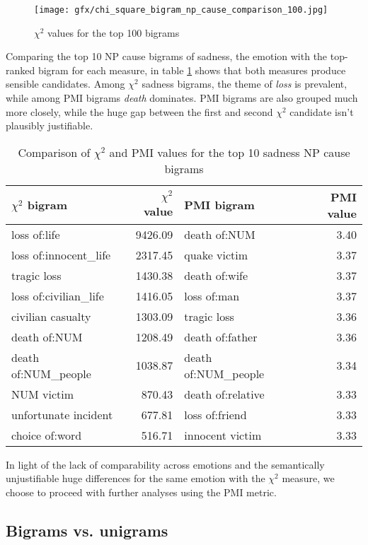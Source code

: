\begin{figure}[bth]
\texttt{[image: gfx/chi\_square\_bigram\_np\_cause\_comparison\_100.jpg]}
\caption{$\chi^{2}$ values for the top 100 bigrams}\label{fig:chi-square distribution}
\end{figure}

Comparing the top 10 NP cause bigrams of sadness, the emotion with the top-ranked bigram for each measure, in table \ref{tab:chi-pmi sadness} shows that both measures produce sensible candidates. Among $\chi^{2}$ sadness bigrams, the theme of \textit{loss} is prevalent, while among PMI bigrams \textit{death} dominates. PMI bigrams are also grouped much more closely, while the huge gap between the first and second $\chi^{2}$ candidate isn't plausibly justifiable.

\begin{table}[h]
\centering
\begin{tabular}{l|r|l|r}
{\bf $\chi^{2}$ bigram} & {\bf $\chi^{2}$ value} & {\bf PMI bigram} & {\bf PMI value} \\\hline
loss of:life & 9426.09 & death of:NUM & 3.40 \\
loss of:innocent\_life  & 2317.45 & quake victim & 3.37 \\
tragic loss             & 1430.38 & death of:wife & 3.37 \\
loss of:civilian\_life  & 1416.05 & loss of:man & 3.37 \\
civilian casualty       & 1303.09 & tragic loss & 3.36 \\
death of:NUM            & 1208.49 & death of:father & 3.36 \\
death of:NUM\_people & 1038.87 & death of:NUM\_people & 3.34 \\
NUM victim           & 870.43 & death of:relative & 3.33 \\
unfortunate incident    & 677.81 & loss of:friend & 3.33 \\
choice of:word          & 516.71 & innocent victim & 3.33 
\end{tabular}
\caption{Comparison of $\chi^{2}$ and PMI values for the top 10 sadness NP cause bigrams}
\label{tab:chi-pmi sadness}
\end{table}

In light of the lack of comparability across emotions and the semantically unjustifiable huge differences for the same emotion with the $\chi^{2}$ measure, we choose to proceed with further analyses using the PMI metric.

\subsection{Bigrams vs. unigrams}

